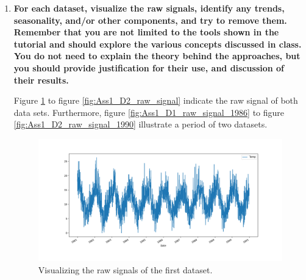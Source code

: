\documentclass[12pt]{article}
\begin{document}



\pagebreak

\begin{enumerate}



\item \textbf{For each dataset, visualize the raw signals, identify any trends, seasonality, and/or other components, and try to remove them. Remember that you are not limited to the tools shown in the tutorial and should explore the various concepts discussed in class. You do not need to explain the theory behind the approaches, but you should provide justification for their use, and discussion of their results.}


Figure \ref{fig:Ass1_D1_raw_signal} to figure \ref{fig:Ass1_D2_raw_signal} indicate the raw signal of both data sets. Furthermore, figure \ref{fig:Ass1_D1_raw_signal_1986} to figure \ref{fig:Ass1_D2_raw_signal_1990} illustrate a period of two datasets. 

\begin{figure}[H]
    \centering
    \begin{minipage}[b]{1\textwidth}
        \includegraphics[width=\textwidth]{figures/Ass1/Ass1_D1_raw_signal.png}
    \end{minipage}
    \caption{Visualizing the raw signals of the first dataset.}
    \label{fig:Ass1_D1_raw_signal}
\end{figure}


\end{enumerate}
\end{document}
